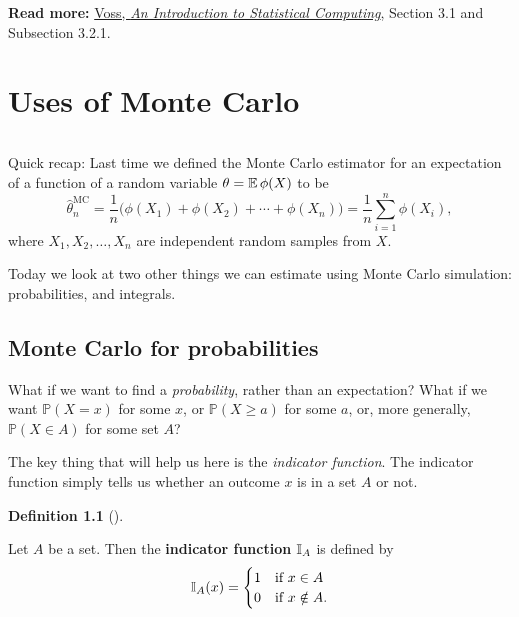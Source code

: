 \documentclass[
  letterpaper,
  DIV=11,
  numbers=noendperiod]{scrreprt}
\theoremstyle{plain}
\theoremstyle{definition}
\newtheorem{definition}{Definition}[chapter]
\theoremstyle{definition}
\theoremstyle{remark}
\begin{document}
\textbf{Read more:}
\href{https://leeds.primo.exlibrisgroup.com/permalink/44LEE_INST/1fj430b/cdi_askewsholts_vlebooks_9781118728031}{Voss,
\emph{An Introduction to Statistical Computing}}, Section 3.1 and
Subsection 3.2.1.

\chapter{Uses of Monte Carlo}\label{uses-of-monte-carlo}

\[\newcommand{\Exg}{\operatorname{\mathbb{E}}} 
\newcommand{\Ex}{\mathbb{E}} 
\newcommand{\Ind}{\mathbb{I}}
\newcommand{\Var}{\operatorname{Var}}
\newcommand{\Cov}{\operatorname{Cov}}
\newcommand{\Corr}{\operatorname{Corr}}
\newcommand{\ee}{\mathrm{e}}\]

Quick recap: Last time we defined the Monte Carlo estimator for an
expectation of a function of a random variable \(\theta = \Exg \phi(X)\)
to be
\[ \widehat{\theta}_n^{\mathrm{MC}} = \frac{1}{n} \big(\phi(X_1) + \phi(X_2) + \cdots + \phi(X_n) \big) = \frac{1}{n} \sum_{i=1}^n \phi(X_i) , \]
where \(X_1, X_2, \dots, X_n\) are independent random samples from
\(X\).

Today we look at two other things we can estimate using Monte Carlo
simulation: probabilities, and integrals.

\section{Monte Carlo for
probabilities}\label{monte-carlo-for-probabilities}

What if we want to find a \emph{probability}, rather than an
expectation? What if we want \(\mathbb P(X = x)\) for some \(x\), or
\(\mathbb P(X \geq a)\) for some \(a\), or, more generally,
\(\mathbb P(X \in A)\) for some set \(A\)?

The key thing that will help us here is the \emph{indicator function}.
The indicator function simply tells us whether an outcome \(x\) is in a
set \(A\) or not.

\begin{definition}[]\protect\hypertarget{def-indicator}{}\label{def-indicator}

Let \(A\) be a set. Then the \textbf{indicator function} \(\Ind_A\) is
defined by
\[ \Ind_A(x) = \begin{cases} 1 & \text{if $x \in A$} \\ 0 & \text{if $x \notin A$.} \end{cases} \]

\end{definition}
\end{document}
